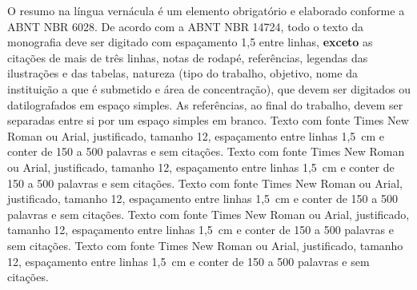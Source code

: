 O resumo na língua vernácula é um elemento obrigatório e elaborado conforme a
ABNT NBR 6028. De acordo com a ABNT NBR 14724, todo o texto da monografia deve
ser digitado com espaçamento 1,5 entre linhas, \textbf{exceto} as citações de mais de
três linhas, notas de rodapé, referências, legendas das ilustrações e das
tabelas, natureza (tipo do trabalho, objetivo, nome da instituição a que é
submetido e área de concentração), que devem ser digitados ou datilografados
em espaço simples. As referências, ao final do trabalho, devem ser separadas
entre si por um espaço simples em branco. Texto com fonte Times New Roman ou
Arial, justificado, tamanho 12, espaçamento entre linhas 1,5~cm e conter de
150 a 500 palavras e sem citações. Texto com fonte Times New Roman ou Arial,
justificado, tamanho 12, espaçamento entre linhas 1,5~cm e conter de 150 a 500
palavras e sem citações. Texto com fonte Times New Roman ou Arial,
justificado, tamanho 12, espaçamento entre linhas 1,5~cm e conter de 150 a 500
palavras e sem citações. Texto com fonte Times New Roman ou Arial,
justificado, tamanho 12, espaçamento entre linhas 1,5~cm e conter de 150 a 500
palavras e sem citações. Texto com fonte Times New Roman ou Arial,
justificado, tamanho 12, espaçamento entre linhas 1,5~cm e conter de 150 a 500
palavras e sem citações.


